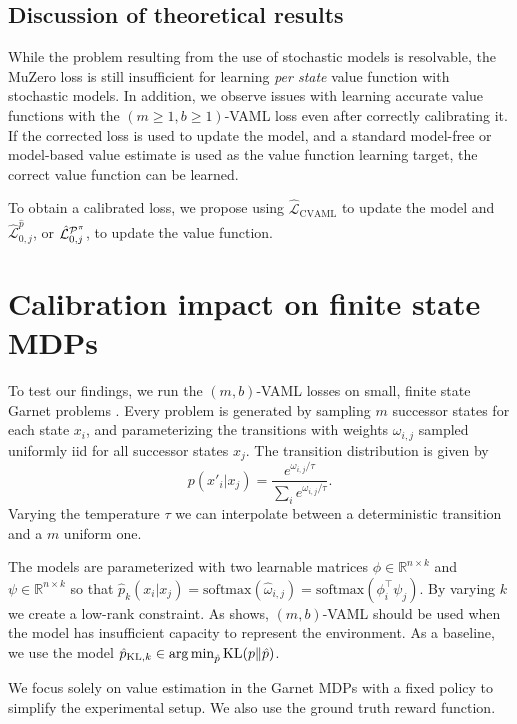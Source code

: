 \subsection{Discussion of theoretical results}
While the problem resulting from the use of stochastic models is resolvable, the MuZero loss is still insufficient for learning \emph{per state} value function with stochastic models.
In addition, we observe issues with learning accurate value functions with the $(m\geq1,b\geq1)$-VAML loss even after correctly calibrating it.
If the corrected loss is used to update the model, and a standard model-free or model-based value estimate is used as the value function learning target, the correct value function can be learned.

\begin{boxinsight}
    To obtain a calibrated loss, we propose using $\hat{\mathcal{L}}_\mathrm{CVAML}$ to update the model and $\hat{\mathcal{L}}^{\hat{p}}_{0,j}$, or $\hat{\mathcal{L}}^{\P^\pi}_{0,j}$, to update the value function.
\end{boxinsight}

\section{Calibration impact on finite state MDPs}
\label{sec:cvaml:empirical1}

To test our findings, we run the $(m,b)$-VAML losses on small, finite state Garnet problems \parencite{bhatnagar2007incremental}.
Every problem is generated by sampling $m$ successor states for each state $x_i$, and parameterizing the transitions with weights $\omega_{i,j}$ sampled uniformly iid for all successor states $x_j$.
The transition distribution is given by $$p(x'_i|x_j) = \frac{e^{\omega_{i,j}/\tau}}{\sum_i e^{\omega_{i,j}/\tau}}.$$
Varying the temperature $\tau$ we can interpolate between a deterministic transition and a $m$ uniform one.

The models are parameterized with two learnable matrices $\phi \in \mathbb{R}^{n\times k}$ and $\psi \in \mathbb{R}^{n\times k}$ so that $\hat{p}_k(x_i| x_j)  = \mathrm{softmax}(\hat{\omega}_{i,j}) = \mathrm{softmax}(\phi_i^\top \psi_j)$.
By varying $k$ we create a low-rank constraint.
As \textcite{vaml} shows, $(m,b)$-VAML should be used when the model has insufficient capacity to represent the environment.
As a baseline, we use the model $\hat{p}_{\mathrm{KL}, k}\in \argmin_{\hat{p}} \mathrm{KL}(p\|\hat{p})$.

We focus solely on value estimation in the Garnet MDPs with a fixed policy to simplify the experimental setup.
We also use the ground truth reward function.

